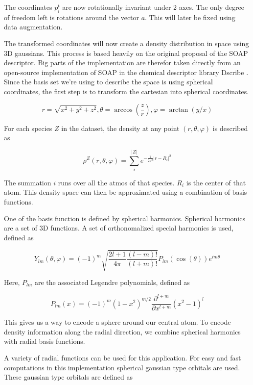 The coordinates $p^t_i$ are now rotationally invariant under 2 axes. 
The only degree of freedom left is rotations around the vector $a$. 
This will later be fixed using data augmentation.

The transformed coordinates will now create a density distribution in space using 3D gaussians.
This process is based heavily on the original proposal of the SOAP descriptor.
Big parts of the implementation are therefor taken directly from an open-source implementation of SOAP in the chemical descriptor library Dscribe \cite{dscribe}.
\\
Since the basis set we're using to describe the space is using spherical coordinates, the first step is to transform the cartesian into spherical coordinates.

$$
r = \sqrt{x^2 + y^2 + z^2}
,
\theta = \arccos(\frac{z}{r})
,
\varphi = \arctan(y / x)
$$

For each species $Z$ in the dataset, the density at any point $(r, \theta, \varphi)$ is described as

$$\rho^Z(r, \theta, \varphi) = \sum_i^{|Z|} e^{- \frac{1}{2\sigma^2} \vert r - R_i \vert^2 }$$

The summation $i$ runs over all the atmos of that species. $R_i$ is the center of that atom.
This density space can then be approximated using a combination of basis functions.

One of the basis function is defined by spherical harmonics. 
Spherical harmonics are a set of 3D functions.
A set of orthonomalized special harmonics is used, defined as

$$
Y_{lm}(\theta, \varphi) = (-1)^m \sqrt{\frac{2l + 1}{4 \pi} \frac{(l - m)!}{(l + m)!}} P_{lm}(\cos(\theta)) e^{im\theta}
$$

Here, $P_{lm}$ are the associated Legendre polynomials, defined as

$$
P_{lm}(x) = (-1)^m (1-x^2)^{m/2} \frac{\partial^{l+m}}{\partial x^{l+m}}(x^2 - 1)^l
$$ %


This gives us a way to encode a sphere around our central atom. 
To encode density information along the radial direction, we combine spherical harmonics with radial basis functions.

A variety of radial functions can be used for this application.
For easy and fast computations in this implementation spherical gaussian type orbitals are used. 
These gaussian type orbitals are defined as

